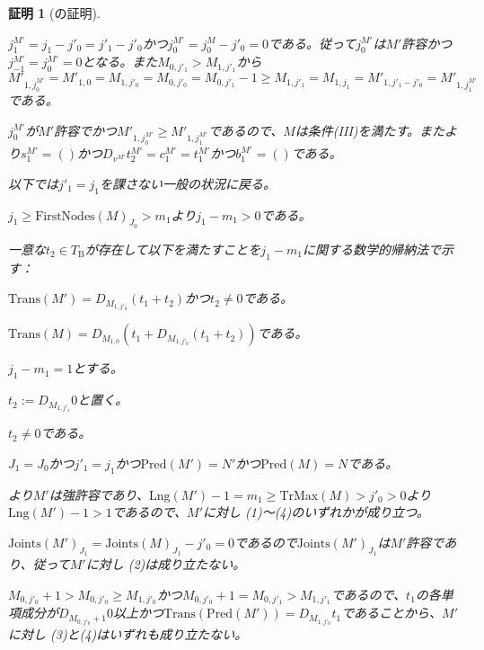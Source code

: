 \documentclass[dvipdfmx,uplatex]{jsarticle}
\theoremstyle{customnonumberbreakfortheorem}
\theoremstyle{customnonumberbreakforproof}
\newtheorem{hideableproof}{証明}
\begin{document}
\begin{hideableproof}[の証明]
\begin{indented}
\begin{indented}
			\item \(j_1^{M'} = j_1-j'_0 = j'_1-j'_0\)かつ\(j_0^{M'} = j_0^M-j'_0 = 0\)である。従って\(j_0^{M'}\)は\(M'\)許容かつ\(j_{-1}^{M'} = j_0^{M'} = 0\)となる。また\(M_{0,j'_1} > M_{1,j'_1}\)から\(M'_{1,j_0^{M'}} = M'_{1,0} = M_{1,j'_0} = M_{0,j'_0} = M_{0,j'_1}-1 \geq M_{1,j'_1} = M_{1,j_1} = M'_{1,j'_1-j'_0} = M'_{1,j_1^{M'}}\)である。
			\item \(j_0^{M'}\)が\(M'\)許容でかつ\(M'_{1,j_0^{M'}} \geq M'_{1,j_1^{M'}}\)であるので、\(M\)は条件(III)を満たす。またより\(s_1^{M'} = ()\)かつ\(D_{v^{M'}} t_2^{M'} = c_1^{M'} = t_1^{M'}\)かつ\(b_1^{M'} = ()\)である。
		\end{indented}
		\item 以下では\(j'_1 = j_1\)を課さない一般の状況に戻る。
		\item
		\item \(j_1 \geq \textrm{FirstNodes}(M)_{J_0} > m_1\)より\(j_1-m_1 > 0\)である。
		\item 一意な\(t_2 \in T_{\textrm{B}}\)が存在して以下を満たすことを\(j_1-m_1\)に関する数学的帰納法で示す：
		\begin{penumerate}
			\setcounter{penumeratei}{2}
			\item \(\textrm{Trans}(M') = D_{M_{1,j'_0}}(t_1 + t_2)\)かつ\(t_2 \neq 0\)である。
			\item \(\textrm{Trans}(M) = D_{M_{1,0}}(t_1 + D_{M_{1,j'_0}}(t_1 + t_2))\)である。
		\end{penumerate}
		\item
		\item \(j_1-m_1 = 1\)とする。
		\begin{indented}
			\item \(t_2 := D_{M_{1,j'_1}} 0\)と置く。
			\item \(t_2 \neq 0\)である。
			\item \(J_1 = J_0\)かつ\(j'_1 = j_1\)かつ\(\textrm{Pred}(M') = N'\)かつ\(\textrm{Pred}(M) = N\)である。
			\item {}より\(M'\)は強許容であり、\(\textrm{Lng}(M')-1 = m_1 \geq \textrm{TrMax}(M) > j'_0 > 0\)より\(\textrm{Lng}(M')-1 > 1\)であるので、\(M'\)に対し (1)～(4)のいずれかが成り立つ。
			\item \(\textrm{Joints}(M')_{J_1} = \textrm{Joints}(M)_{J_1}-j'_0 = 0\)であるので\(\textrm{Joints}(M')_{J_1}\)は\(M'\)許容であり、従って\(M'\)に対し (2)は成り立たない。
			\item \(M_{0,j'_0}+1 > M_{0,j'_0} \geq M_{1,j'_0}\)かつ\(M_{0,j'_0}+1 = M_{0,j'_1} > M_{1,j'_1}\)であるので、\(t_1\)の各単項成分が\(D_{M_{0,j'_0}+1} 0\)以上かつ\(\textrm{Trans}(\textrm{Pred}(M')) = D_{M_{1,j'_0}} t_1\)であることから、\(M'\)に対し (3)と(4)はいずれも成り立たない。

\end{indented}
\end{indented}
\end{hideableproof}
\end{document}
